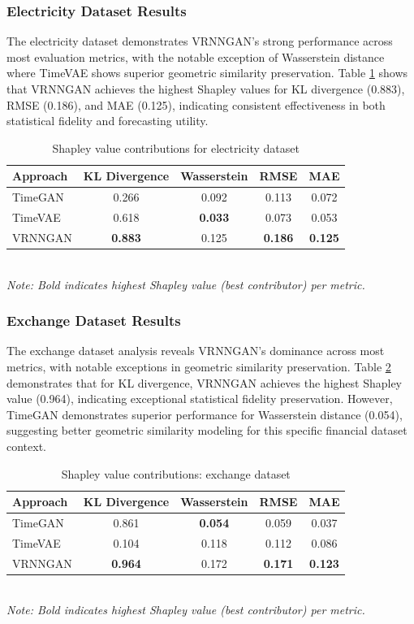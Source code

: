 \documentclass{article}
\begin{document}
\subsubsection{Electricity Dataset Results}

The electricity dataset demonstrates VRNNGAN's strong performance across most evaluation metrics, with the notable exception of Wasserstein distance where TimeVAE shows superior geometric similarity preservation. Table \ref{tab:shapley_electricity} shows that VRNNGAN achieves the highest Shapley values for KL divergence (0.883), RMSE (0.186), and MAE (0.125), indicating consistent effectiveness in both statistical fidelity and forecasting utility.
\begin{table}[H]
\centering
\caption{Shapley value contributions for  electricity dataset}
\label{tab:shapley_electricity}
\begin{tabular}{lcccc}
\toprule
\textbf{Approach} & \textbf{KL Divergence} & \textbf{Wasserstein} & \textbf{RMSE} & \textbf{MAE} \\
\midrule
TimeGAN & 0.266 & 0.092 & 0.113 & 0.072 \\
TimeVAE & 0.618 & \textbf{0.033} & 0.073 & 0.053 \\
VRNNGAN & \textbf{0.883} & 0.125 & \textbf{0.186} & \textbf{0.125} \\
\bottomrule
\end{tabular}
\\[0.5em]
\footnotesize
\textit{Note: Bold indicates highest Shapley value (best contributor) per metric.}
\end{table}

\subsubsection{Exchange Dataset Results}
The exchange dataset analysis reveals VRNNGAN's dominance across most metrics, with notable exceptions in geometric similarity preservation. Table \ref{tab:shapley_exchange} demonstrates that for KL divergence, VRNNGAN achieves the highest Shapley value (0.964), indicating exceptional statistical fidelity preservation. However, TimeGAN demonstrates superior performance for Wasserstein distance (0.054), suggesting better geometric similarity modeling for this specific financial dataset context.

\begin{table}[H]
\centering
\caption{Shapley value contributions: exchange dataset}
\label{tab:shapley_exchange}
\begin{tabular}{lcccc}
\toprule
\textbf{Approach} & \textbf{KL Divergence} & \textbf{Wasserstein} & \textbf{RMSE} & \textbf{MAE} \\
\midrule
TimeGAN & 0.861 & \textbf{0.054} & 0.059 & 0.037 \\
TimeVAE & 0.104 & 0.118 & 0.112 & 0.086 \\
VRNNGAN & \textbf{0.964} & 0.172 & \textbf{0.171} & \textbf{0.123} \\
\bottomrule
\end{tabular}
\\[0.5em]
\footnotesize
\textit{Note: Bold indicates highest Shapley value (best contributor) per metric.}
\end{table}
\end{document}
